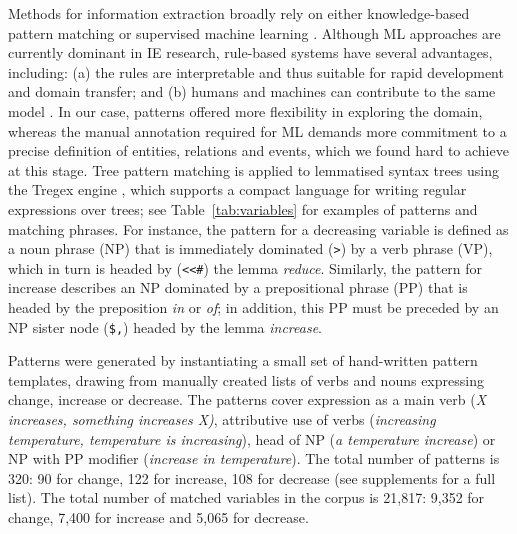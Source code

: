 \documentclass[11pt]{article}
\begin{document}
Methods for information extraction broadly rely on either knowledge-based pattern matching or supervised machine learning \cite{Sarawagi:2008:IE:1498844.1498845}.
Although ML approaches are currently dominant in IE research, rule-based systems have several advantages, including: (a) the rules are interpretable and thus suitable for rapid development and domain transfer; and (b) humans and machines can contribute to the same model \cite{Valenzuela-Escarcega:2015aa}.
In our case, patterns offered more flexibility in exploring the domain, whereas the manual annotation required for ML demands more commitment to a precise definition of entities, relations and events, which we found hard to achieve at this stage.
Tree pattern matching is applied to lemmatised syntax trees using the Tregex engine \cite{Levy2006}, which supports a compact language for writing regular expressions over trees; 
see Table~\ref{tab:variables} for examples of patterns and matching phrases.
For instance, the pattern for a decreasing variable is defined as a noun phrase (NP) that is immediately dominated (\verb|>|) by a verb phrase (VP), which in turn is headed by (\verb|<<#|) the lemma \emph{reduce}.
Similarly, the pattern for increase describes an NP dominated by a prepositional phrase (PP) that is headed by the preposition \emph{in} or \emph{of}; in addition, this PP must be preceded by an NP sister node (\verb|$,|) headed by the lemma \emph{increase}.

Patterns were generated by instantiating a small set of hand-written pattern templates, drawing from manually created lists of verbs and nouns expressing change, increase or decrease. 
The patterns cover expression as a main verb (\emph{X increases, something increases X)}, attributive use of verbs (\emph{increasing temperature, temperature is increasing}), head of NP (\emph{a temperature increase}) or NP with PP modifier (\emph{increase in temperature}).
The total number of patterns is 320: 90 for change, 122 for increase, 108 for decrease (see supplements for a full list).
The total number of matched variables in the corpus is 21,817: 9,352 for change, 7,400 for increase and 5,065 for decrease.
\end{document}
